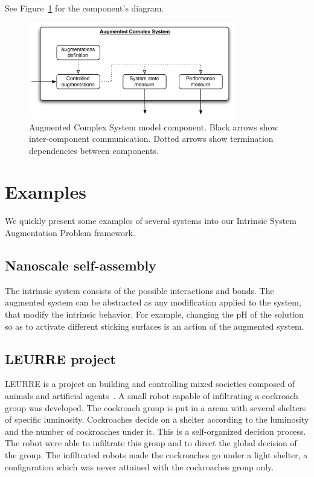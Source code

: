 See Figure~\ref{fig:img_augmented_complex_system} for the component's diagram.

\begin{figure}[h!]
	\centering
		\includegraphics[width=9cm]{img/augmented_complex_system.pdf}
	\caption{Augmented Complex System model component. Black arrows show inter-component communication. Dotted arrows show termination dependencies between components.}
	\label{fig:img_augmented_complex_system}
\end{figure}



\section{Examples} %
\label{sec:examples}

We quickly present some examples of several systems into our Intrinsic System Augmentation Problem framework.

\subsection{Nanoscale self-assembly} %
\label{sub:nanoscale_self_assembly}
The intrinsic system consists of the possible interactions and bonds. The augmented system can be abstracted as any modification applied to the system, that modify the intrinsic behavior. For example, changing the pH of the solution so as to activate different sticking surfaces is an action of the augmented system.

\subsection{LEURRE project} %
\label{sub:leurre_project}
LEURRE is a project on building and controlling mixed societies composed of animals and artificial agents~\cite{Halloy:2007p10740}. A small robot capable of infiltrating a cockroach group was developed. The cockroach group is put in a arena with several shelters of specific luminosity. Cockroaches decide on a shelter according to the luminosity and the number of cockroaches under it. This is a self-organized decision process.
The robot were able to infiltrate this group and to direct the global decision of the group. The infiltrated robots made the cockroaches go under a light shelter, a configuration which was never attained with the cockroaches group only.

